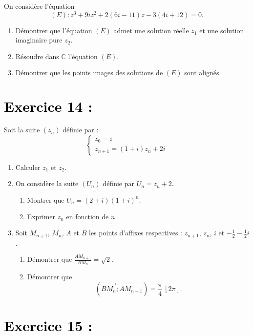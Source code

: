 \documentclass[12pt]{article}
\begin{document}
On considère l’équation 
\[
(E) : z^3 + 9iz^2 + 2(6i - 11)z - 3(4i + 12) = 0.
\]

\begin{enumerate}
    \item Démontrer que l’équation $(E)$ admet une solution réelle $z_1$ et une solution imaginaire pure $z_2$.

    \item Résoudre dans $\mathbb{C}$ l’équation $(E)$.

    \item Démontrer que les points images des solutions de $(E)$ sont alignés.
\end{enumerate}

\section*{\textcolor{black}{Exercice 14 :}}

Soit la suite $(z_n)$ définie par :
\[
\begin{cases}
z_0 = i \\
z_{n+1} = (1 + i)z_n + 2i
\end{cases}
\]

\begin{enumerate}
    \item Calculer $z_1$ et $z_2$.

    \item On considère la suite $(U_n)$ définie par $U_n = z_n + 2$.
    \begin{enumerate}
        \item Montrer que $U_n = (2 + i)(1 + i)^n$.
        \item Exprimer $z_n$ en fonction de $n$.
    \end{enumerate}

    \item Soit $M_{n+1}$, $M_n$, $A$ et $B$ les points d’affixes respectives : $z_{n+1}$, $z_n$, $i$ et $-\frac{1}{2} - \frac{1}{2}i$.

    \begin{enumerate}
        \item Démontrer que $\frac{AM_{n+1}}{BM_n} = \sqrt{2}$.
        \item Démontrer que 
        \[
        (\overrightarrow{BM_n}; \overrightarrow{AM_{n+1}}) = \frac{\pi}{4} \, [2\pi].
        \]
    \end{enumerate}
\end{enumerate}
\section*{\textcolor{black}{Exercice 15 :}}
\end{document}
